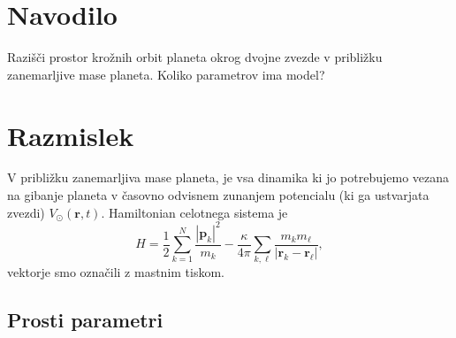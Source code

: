 \documentclass[12pt, a4paper]{article}
\renewcommand{\r}{
    \ensuremath{\mathbf{r}}
}
\newcommand{\p}{
    \ensuremath{\mathbf{p}}
}
\begin{document}
\section{Navodilo}

Razi\v s\v ci prostor kro\v znih orbit planeta okrog dvojne zvezde v pribli\v zku zanemarljive mase
planeta. Koliko parametrov ima model?

\section{Razmislek}

V pribli\v zku zanemarljiva mase planeta, je vsa dinamika ki jo potrebujemo vezana na gibanje planeta
v \v casovno odvisnem zunanjem potencialu (ki ga ustvarjata zvezdi) $V_\odot(\r, t)$. Hamiltonian celotnega
sistema je
\begin{equation}
    H = \frac{1}{2}\sum_{k = 1}^N \frac{|\p_k|^2}{m_k} - \frac{\kappa}{4\pi}\sum_{k,\ell}
        \frac{m_k m_\ell}{|\r_k - \r_\ell|},
    \label{hamilton}
\end{equation}
vektorje smo ozna\v cili z mastnim tiskom.

\subsection{Prosti parametri}
\end{document}

